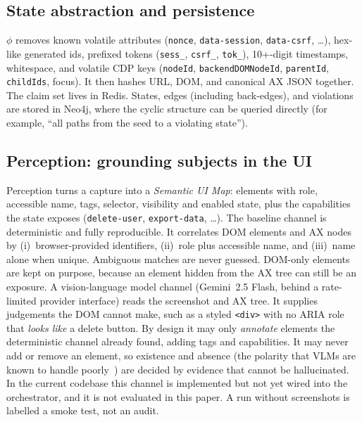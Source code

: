 \subsection{State abstraction and persistence}
$\phi$ removes known volatile attributes (\texttt{nonce},
\texttt{data-session}, \texttt{data-csrf}, \dots), hex-like generated ids,
prefixed tokens (\texttt{sess\_}, \texttt{csrf\_}, \texttt{tok\_}), 10+-digit
timestamps, whitespace, and volatile CDP keys (\texttt{nodeId},
\texttt{backendDOMNodeId}, \texttt{parentId}, \texttt{childIds}, focus). It
then hashes URL, DOM, and canonical AX JSON together. The claim set lives in
Redis. States, edges (including back-edges), and violations are stored in
Neo4j, where the cyclic structure can be queried directly (for example, ``all
paths from the seed to a violating state'').

\subsection{Perception: grounding subjects in the UI}
\label{sec:system:perception}
Perception turns a capture into a \emph{Semantic UI Map}: elements with role,
accessible name, tags, selector, visibility and enabled state, plus the
capabilities the state exposes (\texttt{delete-user}, \texttt{export-data},
\dots). The baseline channel is deterministic and fully reproducible. It
correlates DOM elements and AX nodes by (i)~browser-provided identifiers,
(ii)~role plus accessible name, and (iii)~name alone when unique. Ambiguous
matches are never guessed. DOM-only elements are kept on purpose, because an
element hidden from the AX tree can still be an exposure. A vision-language
model channel (Gemini~2.5 Flash, behind a rate-limited provider interface)
reads the screenshot and AX tree. It supplies judgements the DOM cannot make,
such as a styled \texttt{<div>} with no ARIA role that \emph{looks like} a
delete button. By design it may only \emph{annotate} elements the
deterministic channel already found, adding tags and capabilities. It may never
add or remove an element, so existence and absence (the polarity that VLMs are
known to handle poorly~\cite{alhamoud2025negation}) are decided by evidence
that cannot be hallucinated. In the current codebase this channel is
implemented but not yet wired into the orchestrator, and it is not evaluated
in this paper. A run without screenshots is labelled a smoke test, not an
audit.

